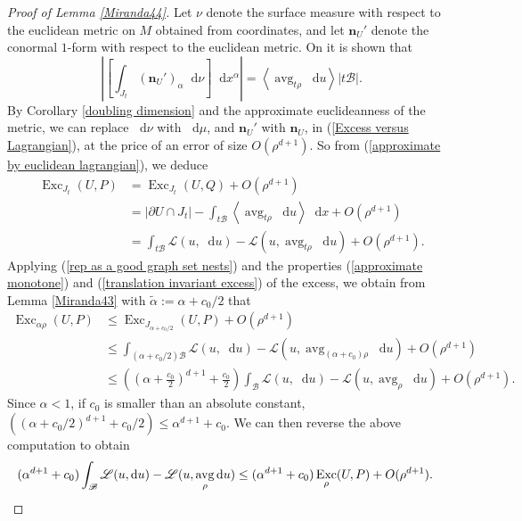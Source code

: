 \documentclass[reqno,11pt]{amsart}
\DeclareMathOperator{\avg}{avg}
\DeclareMathOperator{\Exc}{Exc}
\newcommand*\dif{\mathop{}\!\mathrm{d}}
\newcommand{\Lagrange}{\mathscr L}
\newcommand{\normal}{\mathbf n}
\def\Japan#1{\left \langle #1 \right \rangle}
\theoremstyle{definition}
\numberwithin{equation}{section}
\begin{document}
\begin{proof}[Proof of Lemma \ref{Miranda44}]
Let $\nu$ denote the surface measure with respect to the euclidean metric on $M$ obtained from coordinates, and let $\normal_U'$ denote the conormal $1$-form with respect to the euclidean metric.
On \cite[pg83]{Giusti77} it is shown that
\begin{equation}\label{Excess versus Lagrangian}
\left|\left[\int_{J_t} (\normal_U')_\alpha \dif \nu\right] \dif x^\alpha\right| = \Japan{\avg_{t\rho} \dif u} |t\mathscr B|.
\end{equation}
By Corollary \ref{doubling dimension} and the approximate euclideanness of the metric, we can replace $\dif \nu$ with $\dif \mu$, and $\normal_U'$ with $\normal_U$, in (\ref{Excess versus Lagrangian}), at the price of an error of size $O(\rho^{d + 1})$.
So from (\ref{approximate by euclidean lagrangian}), we deduce 
\begin{align*}
\Exc_{J_t}(U, P)
&= \Exc_{J_t}(U, Q) + O(\rho^{d + 1}) \\
&= |\partial U \cap J_t| - \int_{t\mathscr B} \Japan{\avg_{t\rho} \dif u} \dif x + O(\rho^{d + 1}) \\
&= \int_{t\mathscr B} \Lagrange(u, \dif u) - \Lagrange(u, \avg_{t\rho} \dif u) + O(\rho^{d + 1}).
\end{align*}
Applying (\ref{rep as a good graph set nests}) and the properties (\ref{approximate monotone}) and (\ref{translation invariant excess}) of the excess, we obtain from Lemma \ref{Miranda43} with $\tilde \alpha := \alpha + c_0/2$ that
\begin{align*}
\Exc_{\alpha \rho}(U, P) 
&\leq \Exc_{J_{\alpha + c_0/2}}(U, P) + O(\rho^{d + 1}) \\
&\leq \int_{(\alpha + c_0/2) \mathscr B} \Lagrange(u, \dif u) - \Lagrange(u, \avg_{(\alpha + c_0)\rho} \dif u) + O(\rho^{d + 1}) \\
&\leq \left(\left(\alpha + \frac{c_0}{2}\right)^{d + 1} + \frac{c_0}{2}\right) \int_{\mathscr B} \Lagrange(u, \dif u) - \Lagrange(u, \avg_\rho \dif u) + O(\rho^{d + 1}).
\end{align*}
Since $\alpha < 1$, if $c_0$ is smaller than an absolute constant, $((\alpha + c_0/2)^{d + 1} + c_0/2) \leq \alpha^{d + 1} + c_0$.
We can then reverse the above computation to obtain 
\begin{align*}(\alpha^{d + 1} + c_0) \int_{\mathscr B} \Lagrange(u, \dif u) - \Lagrange(u, \avg_\rho \dif u) &\leq (\alpha^{d + 1} + c_0) \Exc_\rho(U, P) + O(\rho^{d + 1}). \qedhere 
\end{align*}
\end{proof}
\end{document}
